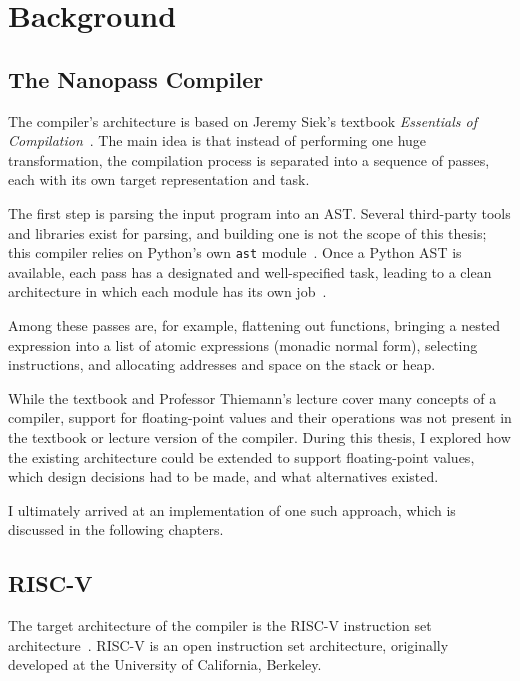 \chapter{Background}\label{chap:background}

\section{The Nanopass Compiler}

The compiler's architecture is based on Jeremy Siek's textbook \textit{Essentials of Compilation}~\citep{siek2023essentials}. The main idea is that instead of performing one huge transformation, the compilation process is separated into a sequence of passes, each with its own target representation and task.

The first step is parsing the input program into an AST. Several third-party tools and libraries exist for parsing, and building one is not the scope of this thesis; this compiler relies on Python's own \texttt{ast} module~\citep{pythonastdocs}. Once a Python AST is available, each pass has a designated and well-specified task, leading to a clean architecture in which each module has its own job~\citep{martin2008cleancode}.

Among these passes are, for example, flattening out functions, bringing a nested expression into a list of atomic expressions (monadic normal form), selecting instructions, and allocating addresses and space on the stack or heap.

While the textbook and Professor Thiemann's lecture cover many concepts of a compiler, support for floating-point values and their operations was not present in the textbook or lecture version of the compiler. During this thesis, I explored how the existing architecture could be extended to support floating-point values, which design decisions had to be made, and what alternatives existed.

I ultimately arrived at an implementation of one such approach, which is discussed in the following chapters.

\section{RISC-V}

The target architecture of the compiler is the RISC-V instruction set architecture~\citep{waterman2016riscv}. RISC-V is an open instruction set architecture, originally developed at the University of California, Berkeley.

